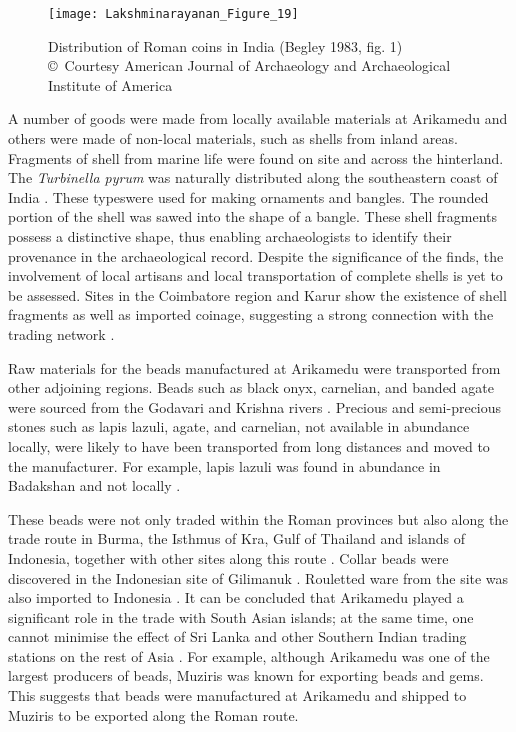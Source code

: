 \begin{wrapfigure}{O}[3cm]{0.5\textwidth} 
	\texttt{[image: Lakshminarayanan\_Figure\_19]}
	\caption{Distribution of Roman coins in India (Begley 1983, fig. 1)\\
		{\normalfont\scriptsize\copyright\ Courtesy American Journal of Archaeology and Archaeological Institute of America
	}}
	\label{fig:Lakshminarayanan_Figure_19}
\end{wrapfigure}
A number of goods were made from locally available materials at Arikamedu and others were made of non-local materials, such as shells from inland areas. Fragments of shell from marine life were found on site and across the hinterland. The \emph{Turbinella pyrum} was naturally distributed along the southeastern coast of India \parencites[][141]{smith2002}{nagappan1974}. These typeswere used for making ornaments and bangles. The rounded portion of the shell was sawed into the shape of a bangle. These shell fragments possess a distinctive shape, thus enabling archaeologists to identify their provenance in the archaeological record. Despite the significance of the finds, the involvement of local artisans and local transportation of complete shells is yet to be assessed. Sites in the Coimbatore region and Karur show the existence of shell fragments as well as imported coinage, suggesting a strong connection with the trading network \parencite[][26]{kamalakar2000}.

Raw materials for the beads manufactured at Arikamedu were transported from other adjoining regions. Beads such as black onyx, carnelian, and banded agate were sourced from the Godavari and Krishna rivers \parencite[][115]{francis2002}. Precious and semi-precious stones such as lapis lazuli, agate, and carnelian, not available in abundance locally, were likely to have been transported from long distances and moved to the manufacturer. For example, lapis lazuli was found in abundance in Badakshan and not locally \parencite[][29]{mairs2016}.

These beads were not only traded within the Roman provinces but also along the trade route in Burma, the Isthmus of Kra, Gulf of Thailand and islands of Indonesia, together with other sites along this route \parencite[][106]{howard2012}. Collar beads were discovered in the Indonesian site of Gilimanuk \parencite[][46]{francis2002}. Rouletted ware from the site was also imported to Indonesia \parencite[][229]{ardika1991}. It can be concluded that Arikamedu played a significant role in the trade with South Asian islands; at the same time, one cannot minimise the effect of Sri Lanka and other Southern Indian trading stations on the rest of Asia \parencite[][46]{francis2002}. For example, although Arikamedu was one of the largest producers of beads, Muziris was known for exporting beads and gems. This suggests that beads were manufactured at Arikamedu and shipped to Muziris to be exported along the Roman route.

